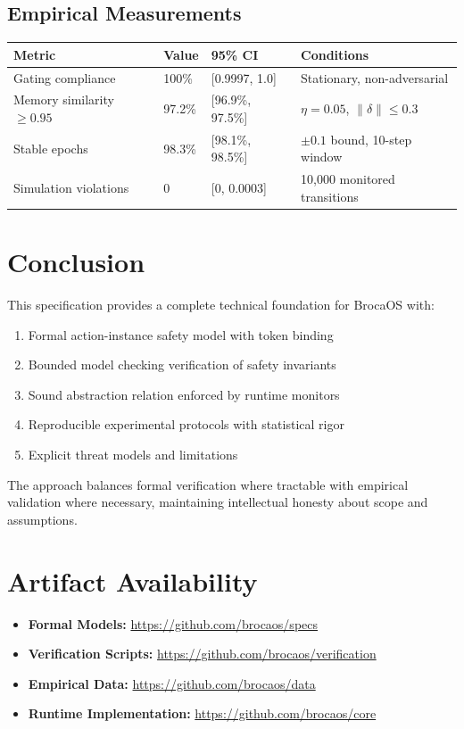 \documentclass[12pt]{article}
\begin{document}
\subsection{Empirical Measurements}

\begin{center}
\begin{tabular}{@{}p{}p{}p{}p{}@{}}
\toprule
\textbf{Metric} & \textbf{Value} & \textbf{95\% CI} & \textbf{Conditions} \\
\midrule
Gating compliance & 100\% & [0.9997, 1.0] & Stationary, non-adversarial \\
Memory similarity $\geq 0.95$ & 97.2\% & [96.9\%, 97.5\%] & $\eta=0.05$, $\|\delta\|\leq0.3$ \\
Stable epochs & 98.3\% & [98.1\%, 98.5\%] & $\pm0.1$ bound, 10-step window \\
Simulation violations & 0 & [0, 0.0003] & 10,000 monitored transitions \\
\bottomrule
\end{tabular}
\end{center}

\section{Conclusion}

This specification provides a complete technical foundation for BrocaOS with:
\begin{enumerate}
    \item Formal action-instance safety model with token binding
    \item Bounded model checking verification of safety invariants
    \item Sound abstraction relation enforced by runtime monitors
    \item Reproducible experimental protocols with statistical rigor
    \item Explicit threat models and limitations
\end{enumerate}

The approach balances formal verification where tractable with empirical validation where necessary, maintaining intellectual honesty about scope and assumptions.

\section*{Artifact Availability}

\begin{itemize}
    \item \textbf{Formal Models:} \url{https://github.com/brocaos/specs}
    \item \textbf{Verification Scripts:} \url{https://github.com/brocaos/verification}
    \item \textbf{Empirical Data:} \url{https://github.com/brocaos/data}
    \item \textbf{Runtime Implementation:} \url{https://github.com/brocaos/core}
\end{itemize}
\end{document}
